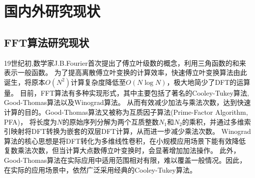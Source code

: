 
\section[\hspace{-2pt}国内外研究现状]{{ \hspace{-8pt}国内外研究现状}}\label{section 1-2}

\subsection[\hspace{-2pt}FFT算法研究现状]{{ \hspace{-8pt}}FFT算法研究现状}\label{section 1-2-2}

19世纪初,数学家J.B.Fourier首次提出了傅立叶级数的概念，利用三角函数的和来表示一般函数\cite{garrido2009pipelined}。
为了提高离散傅立叶变换的计算效率，快速傅立叶变换算法由此诞生，将原本$O(N^2)$计算复杂度降低至$O(N \log N)$，极大地简少了DFT的运算量。
目前，FFT算法有多种实现形式，其中主要包括了著名的Cooley-Tukey算法\cite{cooley1965algorithm},
Good-Thomas算法\cite{temperton1992generalized}以及Winograd算法\cite{winograd1978computing}。
从而有效减少加法与乘法次数，达到快速计算的目的。Good-Thomas算法又被称为互质因子算法(Prime-Factor Algorithm, PFA)，
将长度为$N$的原始序列分解为两个互质整数$N_{1}$和$N_{2}$的乘积，并通过多维索引映射将DFT转换为嵌套的双层DFT计算，从而进一步减少乘法次数。
Winograd算法的核心思想是将DFT转化为多维线性卷积，在小规模应用场景下能有效降低复数乘法次数，但当计算大点数傅立叶变换时，会显著增加加法操作。
此外，Good-Thomas算法在实际应用中适用范围相对有限，难以覆盖一般情况。因此，在实际的应用场景中，依然广泛采用经典的Cooley-Tukey算法。

